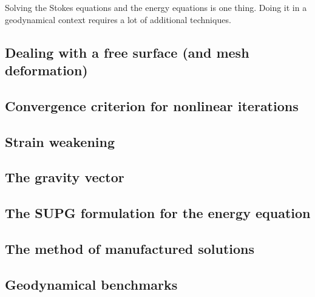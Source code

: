 
Solving the Stokes equations and the energy equations is one thing. Doing it in 
a geodynamical context requires a lot of additional techniques. 
\newpage %
\subsection{Dealing with a free surface (and mesh deformation)}\label{sec:freesurface}  
\newpage %
\subsection{Convergence criterion for nonlinear iterations\label{sec:nlconvcrit}} 
\newpage %
\subsection{Strain weakening} \label{sec:strainweakening}  %
\newpage %
\subsection{The gravity vector} \label{sec:gravityvector}  %
\newpage %
\subsection{The SUPG formulation for the energy equation} \label{ss:supg}  %
\newpage %
\subsection{The method of manufactured solutions \label{mms}}  %
\newpage %
\subsection{Geodynamical benchmarks}\label{sec:geobench}  %
\newpage %
